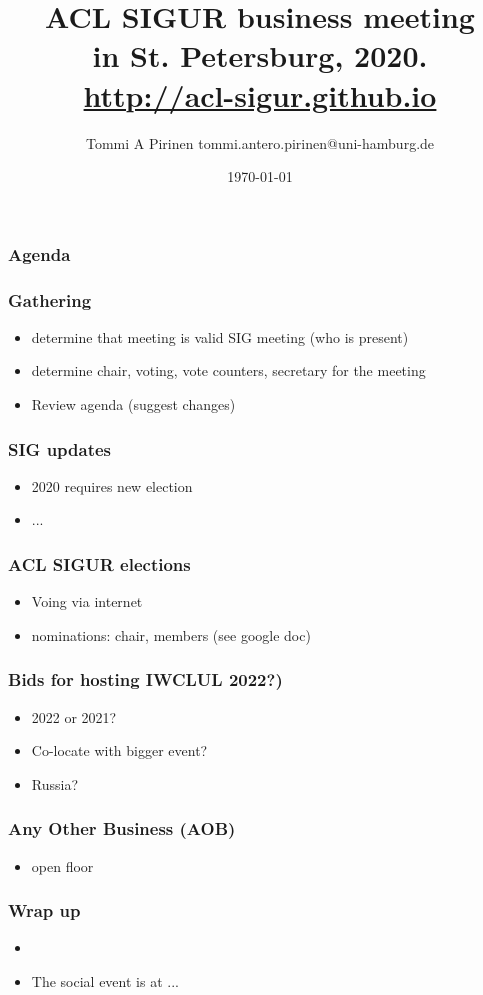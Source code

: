 \documentclass{beamer}
\title{ACL SIGUR business meeting\\
\scriptsize{in St. Petersburg, 2020.\\
\url{http://acl-sigur.github.io}}}
\author{Tommi A Pirinen \scriptsize \guilsinglleft
tommi.antero.pirinen@uni-hamburg.de \guilsinglright }
\institute{UHH, HZSK}
\date{\today}
\makeatletter
\newcommand\listofframes{\@starttoc{lbf}}
\makeatother
\begin{document}

\maketitle

\begin{frame}
    \frametitle{Agenda}
    \listofframes
\end{frame}

\begin{frame}
    \frametitle{Gathering}
    \begin{itemize}
        \item determine that meeting is valid SIG meeting (who is present)
        \item determine chair, voting, vote counters, secretary for the meeting
        \item Review agenda (suggest changes)
    \end{itemize}
\end{frame}

\begin{frame}
    \frametitle{SIG updates}
    \begin{itemize}
        \item 2020 requires new election
        \item ...
    \end{itemize}
\end{frame}

\begin{frame}
    \frametitle{ACL SIGUR elections}
    \begin{itemize}
        \item Voing via internet
        \item nominations: chair, members (see google doc)
    \end{itemize}
\end{frame}

\begin{frame}
    \frametitle{Bids for hosting IWCLUL 2022?)}
    \begin{itemize}
        \item 2022 or 2021?
        \item Co-locate with bigger event?
        \item Russia?
    \end{itemize}
\end{frame}

\begin{frame}
    \frametitle{Any Other Business (AOB)}
    \begin{itemize}

        \item open floor
    \end{itemize}
\end{frame}

\begin{frame}
    \frametitle{Wrap up}
    \begin{itemize}
        \item
        \item The social event is at ...
    \end{itemize}
\end{frame}
\end{document}
